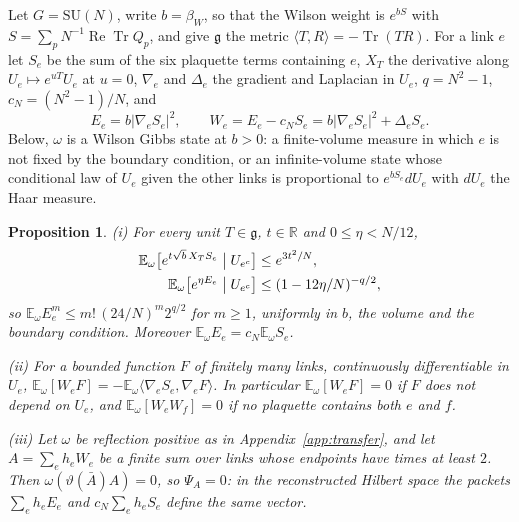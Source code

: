 \documentclass[11pt]{amsart}
\newtheorem{proposition}[theorem]{Proposition}
\theoremstyle{definition}
\theoremstyle{remark}
\numberwithin{equation}{section}
\newcommand{\R}{\mathbb{R}}
\newcommand{\E}{\mathbb{E}}
\newcommand{\SU}{\mathrm{SU}}
\newcommand{\g}{\mathfrak{g}}
\newcommand{\Tr}{\operatorname{Tr}}
\newcommand{\ReTr}{\operatorname{Re}\operatorname{Tr}}
\newcommand{\ip}[2]{\langle #1,#2\rangle}
\begin{document}
Let $G=\SU(N)$, write $b=\beta_W$, so that the Wilson weight is $e^{bS}$ with
$S=\sum_pN^{-1}\ReTr Q_p$, and give $\g$ the metric $\ip TR=-\Tr(TR)$. For a link
$e$ let $S_e$ be the sum of the six plaquette terms containing $e$, $X_T$ the
derivative along $U_e\mapsto e^{uT}U_e$ at $u=0$, $\nabla_e$ and $\Delta_e$ the
gradient and Laplacian in $U_e$, $q=N^2-1$, $c_N=(N^2-1)/N$, and
\[
E_e=b|\nabla_eS_e|^2,\qquad W_e=E_e-c_NS_e=b|\nabla_eS_e|^2+\Delta_eS_e .
\]
Below, $\omega$ is a Wilson Gibbs state at $b>0$: a finite-volume measure in
which $e$ is not fixed by the boundary condition, or an infinite-volume state
whose conditional law of $U_e$ given the other links is proportional to
$e^{bS_e}dU_e$ with $dU_e$ the Haar measure.

\begin{proposition}\label{prop:force}
\textup{(i)} For every unit $T\in\g$, $t\in\R$ and $0\le\eta<N/12$,
\[
\begin{split}
\E_\omega\bigl[e^{t\sqrt b\,X_TS_e}\bigm|U_{e^c}\bigr]&\le e^{3t^2/N},\\
\E_\omega\bigl[e^{\eta E_e}\bigm|U_{e^c}\bigr]&\le(1-12\eta/N)^{-q/2},
\end{split}
\]
so $\E_\omega E_e^m\le m!\,(24/N)^m2^{q/2}$ for $m\ge1$, uniformly in $b$,
the volume and the boundary condition. Moreover $\E_\omega E_e=c_N\E_\omega
S_e$.

\textup{(ii)} For a bounded function $F$ of finitely many links,
continuously differentiable in $U_e$,
$\E_\omega[W_eF]=-\E_\omega\ip{\nabla_eS_e}{\nabla_eF}$. In particular
$\E_\omega[W_eF]=0$ if $F$ does not depend on $U_e$, and
$\E_\omega[W_eW_f]=0$ if no plaquette contains both $e$ and $f$.

\textup{(iii)} Let $\omega$ be reflection positive as in
Appendix~\textup{\ref{app:transfer}}, and let $A=\sum_eh_eW_e$ be a finite
sum over links whose endpoints have times at least $2$. Then
$\omega(\vartheta(\bar A)A)=0$, so $\Psi_A=0$: in the reconstructed Hilbert
space the packets $\sum_eh_eE_e$ and $c_N\sum_eh_eS_e$ define the same vector.
\end{proposition}
\end{document}
